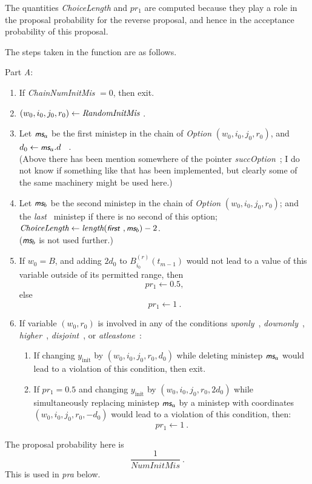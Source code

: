 \documentclass[a4paper,12pt,fleqn]{article}
\newcommand{\nnm}[1]{\textsf{\small\textit{#1}\ }}
\newcommand{\ms}{\textsl{\textsf{\small ms}}} %
\begin{document}
The quantities \textit{ChoiceLength} and $pr_1$ are computed
because they play a role in the proposal probability
for the reverse proposal, and hence in the acceptance
probability of this proposal.

The steps taken in the function are as follows.

\newpage
Part \emph{A}:
\begin{enumerate}
\item If \textit{ChainNumInitMis} $ = 0$, then exit.
\item  $ (w_0,i_0,j_0,r_0)  \leftarrow  \emph{RandomInitMis}$ .
\item Let $\ms_a$ be
      the first ministep in the chain
      of \textit{Option} $(w_0,i_0,j_0,r_0)$,
      and \\
      $d_0 \leftarrow \ms_a.d$ \ . \\
      (Above there has been mention somewhere of the pointer \nnm{succOption};
      I do not know if something like that has been implemented,
      but clearly some of the same machinery might be used here.)
\item Let $\ms_b$ be
      the second ministep in the chain
      of \textit{Option} $(w_0,i_0,j_0,r_0)$; and the \nnm{last} ministep
      if there is no second of this option;\\
       $\textit{ChoiceLength} \leftarrow
                \textit{length}(\nnm{first}, \ms_b ) - 2$.\\
      ($\ms_b$ is not used further.)
\item   If $w_0 = B$, and adding $2 d_0$ to $B^{(r)}_{i_0}(t_{m-1})$
         would not lead to a value of this variable outside of its
         permitted range, then
         \[
              pr_1   \leftarrow  0.5  ,
         \]
        else
       \[
            pr_1   \leftarrow  1  \ .
        \]
\item If variable $(w_0, r_0)$ is involved in any of the conditions
      \nnm{uponly}, \nnm{downonly}, \nnm{higher}, \nnm{disjoint},
      or \nnm{atleastone}:
      \begin{enumerate}
      \item       If changing $y_{\text{init}}$
             by $(w_0,i_0,j_0,r_0,d_0)$ while deleting ministep $\ms_a$ would
             lead to a violation of this condition, then exit.
      \item       If $pr_1 = 0.5$ and changing $y_{\text{init}}$
        by $(w_0,i_0,j_0,r_0,2 d_0)$ while simultaneously
        replacing ministep $\ms_a$ by a ministep with coordinates
        $(w_0,i_0,j_0,r_0,-d_0)$  would
      lead to a violation of this condition,
      then:
      \[
       pr_1  \leftarrow  1 \ .
      \]
      \end{enumerate}
\end{enumerate}
The proposal probability here is
\[
\frac{1}{\textit{NumInitMis}} \ .
\]
This is used in \textit{pra} below.
\end{document}
